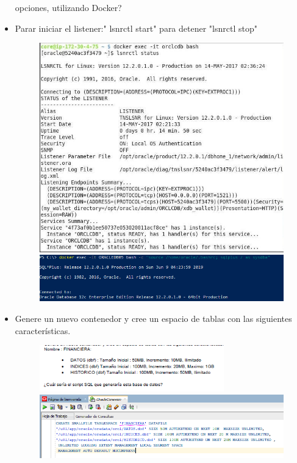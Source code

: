 \begin{itemize}
opciones, utilizando Docker?
                     \item Parar iniciar el listener:" lsnrctl start"  para detener "lsnrctl stop"
                      \begin{figure}[H]
		\begin{center}
		\includegraphics[width=15cm]{./Imagenes/203}
                      \includegraphics[width=15cm]{./Imagenes/204}
		\end{center}
		\end{figure}
		\item Genere un nuevo contenedor y cree un espacio de tablas con las siguientes características.
		\begin{figure}[H]
		\begin{center}
		\includegraphics[width=8cm]{./Imagenes/t3}
		\includegraphics[width=15cm]{./Imagenes/23}
		\end{center}
		\end{figure}


	\end{itemize}



